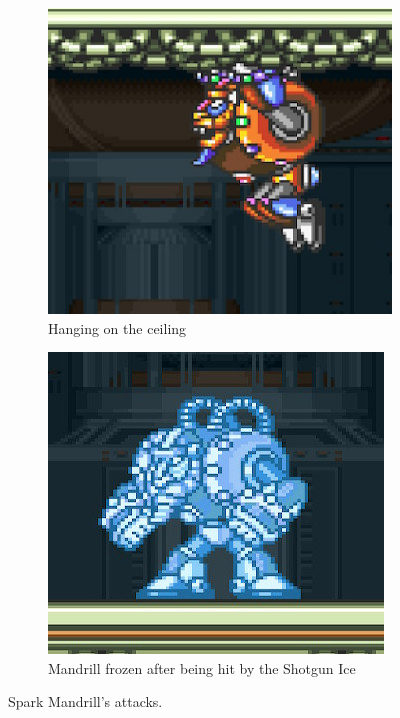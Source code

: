 \begin{figure}[htp]
\begin{subfigure}[t]{0.4\linewidth}
		\includegraphics[width=\linewidth]{figures/X1/Spark_mandrill/Mandrill_hang.jpg}
		\caption{Hanging on the ceiling}
	\end{subfigure}
	\begin{subfigure}[t]{0.4\linewidth}
		\centering
		\includegraphics[width=\linewidth]{figures/X1/Spark_mandrill/Mandrill_frozen.jpg}
		\caption{Mandrill frozen after being hit by the Shotgun Ice}
	\end{subfigure}
	\caption{Spark Mandrill's attacks.}
\end{figure}

